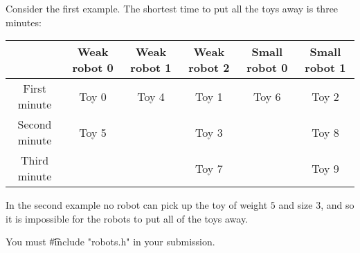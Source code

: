 Consider the first example.
The shortest time to put all the toys away is three minutes:
\begin{center}
\begin{tabular}{ |c|c|c|c|c|c| }
\hline
 & Weak robot 0 & Weak robot 1 & Weak robot 2 & Small robot 0 & Small robot 1\\
\hline
First minute & Toy 0 & Toy 4 & Toy 1 & Toy 6 & Toy 2\\
\hline
Second minute & Toy 5 & & Toy 3 & & Toy 8\\
\hline
Third minute & & & Toy 7 & & Toy 9\\
\hline
\end{tabular}
\end{center}
In the second example no robot can pick up the toy of weight $5$ and size $3$, and so it is impossible for the robots to put all of the toys away.

You must \t{\#include "robots.h"} in your submission.